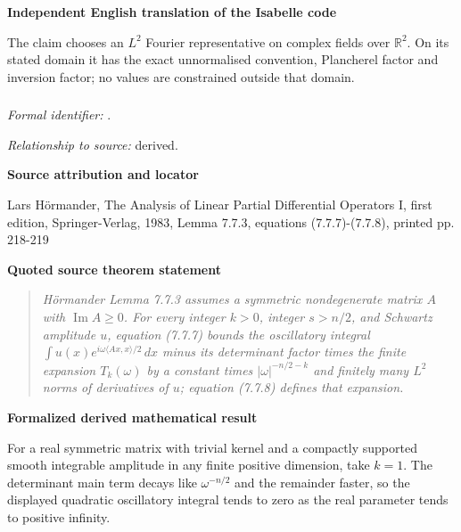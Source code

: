 \documentclass[10pt,oneside]{article}
\newenvironment{sourcequote}{\begin{quote}\itshape}{\end{quote}}
\newcommand{\reviewlabel}[1]{\par\smallskip\noindent\textsf{\bfseries #1}\par\smallskip}
\begin{document}
\reviewlabel{Independent English translation of the Isabelle code}
The claim chooses an $L^2$ Fourier representative on complex fields over $\mathbb R^2$. On its stated domain it has the exact unnormalised convention, Plancherel factor and inversion factor; no values are constrained outside that domain.

\subsubsection{\texttt{}}
\noindent\textit{Formal identifier:} \texttt{}.\par
\noindent\textit{Relationship to source:} derived.

\reviewlabel{Source attribution and locator}
Lars Hörmander, The Analysis of Linear Partial Differential Operators I, first edition, Springer-Verlag, 1983, Lemma 7.7.3, equations (7.7.7)-(7.7.8), printed pp. 218-219

\reviewlabel{Quoted source theorem statement}
\begin{sourcequote}
H\"ormander Lemma 7.7.3 assumes a symmetric nondegenerate matrix $A$ with $\operatorname{Im}A\geq0$. For every integer $k>0$, integer $s>n/2$, and Schwartz amplitude $u$, equation (7.7.7) bounds the oscillatory integral $\int u(x)e^{i\omega\langle Ax,x\rangle/2}\,dx$ minus its determinant factor times the finite expansion $T_k(\omega)$ by a constant times $|\omega|^{-n/2-k}$ and finitely many $L^2$ norms of derivatives of $u$; equation (7.7.8) defines that expansion.
\end{sourcequote}

\reviewlabel{Formalized derived mathematical result}
For a real symmetric matrix with trivial kernel and a compactly supported smooth integrable amplitude in any finite positive dimension, take $k=1$. The determinant main term decays like $\omega^{-n/2}$ and the remainder faster, so the displayed quadratic oscillatory integral tends to zero as the real parameter tends to positive infinity.
\end{document}
